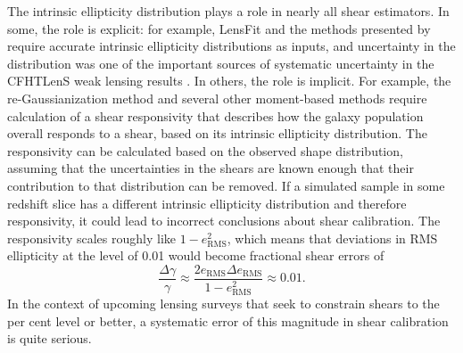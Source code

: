 \documentclass[twocolumn,useAMS,usenatbib]{mn2e}
\begin{document}
The intrinsic ellipticity distribution plays a role in nearly all
shear estimators.  In some, the role is explicit: for example, LensFit
\citep{2007MNRAS.382..315M,2008MNRAS.390..149K,2013MNRAS.429.2858M}
and the methods presented by \cite{2014MNRAS.438.1880B} require
accurate intrinsic ellipticity distributions as inputs, and
uncertainty in the distribution was one of the important sources of
systematic uncertainty in the CFHTLenS weak lensing results
\citep{2013MNRAS.432.2433H,2013MNRAS.429.2858M}.  In others, the role
is implicit.  For example, the re-Gaussianization method and several
other moment-based methods require calculation of a shear responsivity
\citep{BJ02,HS03} that describes how the galaxy population overall
responds to a shear, based on its intrinsic ellipticity distribution.
The responsivity can be calculated based on the observed shape
distribution, assuming that the uncertainties in the shears are known
enough that their contribution to that distribution can be removed.
If a simulated sample in some redshift slice has a different intrinsic
ellipticity distribution and therefore responsivity, it could lead to
incorrect conclusions about shear calibration.  The responsivity
scales roughly like $1-e_\text{RMS}^2$, which means that deviations in
RMS ellipticity at the level of 0.01 would become fractional shear
errors of
\begin{equation}
\frac{\Delta\gamma}{\gamma} \approx \frac{2 e_\text{RMS} \Delta
  e_\text{RMS} }{1-e_\text{RMS}^2} \approx 0.01.
\end{equation}
In the context of upcoming lensing surveys that seek to constrain
shears to the per cent level or better, a systematic error of this
magnitude in shear calibration is quite serious.
\end{document}
